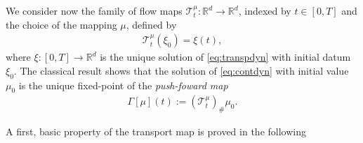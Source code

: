 \documentclass[A4paper,11pt]{article}
\theoremstyle{definition}
\newcommand{\R}{\mathbb{R}}
\begin{document}
We consider now the family of flow maps $\mathcal{T}^{\mu}_t:\R^d \rightarrow\R^d$, indexed by $t \in [0,T]$ and the choice of the mapping $\mu$, defined by
\begin{align*}
\mathcal{T}^{\mu}_t(\xi_0) = \xi(t),
\end{align*}
where $\xi:[0,T]\rightarrow\R^d$ is the unique solution of \eqref{eq:transpdyn} with initial datum $\xi_0$. The classical result \cite[Theorem 3.10]{CanCarRos10} shows that the solution of \eqref{eq:contdyn} with initial value $\mu_0$ is the unique fixed-point of the \textit{push-foward map}
\begin{align}\label{eq:fixedpoint}
\Gamma[\mu](t) := (\mathcal{T}^{\mu}_t)_{\#}\mu_0.
\end{align}

A first, basic property of the transport map is proved in the following
\end{document}
